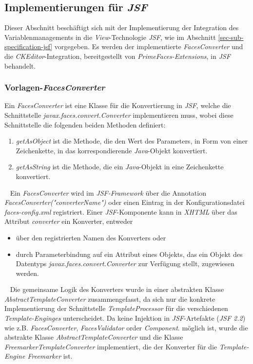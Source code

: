 \subsection{Implementierungen für \emph{JSF}}
\label{sec:sub-impl-integartion-jsf}
Dieser Abschnitt beschäftigt sich mit der Implementierung der Integration des Variablenmanagements in die \emph{View}-Technologie \emph{JSF}, wie im Abschnitt \ref{sec-sub-specification-jsf} vorgegeben. Es werden der implementierte \emph{FacesConverter} und die \emph{CKEditor}-Integration, bereitgestellt von \emph{PrimeFaces-Extensions}, in \emph{JSF} behandelt.

\subsubsection{Vorlagen-\emph{FacesConverter}}
Ein \emph{FacesConverter} ist eine Klasse für die Konvertierung in \emph{JSF}, welche die Schnittstelle \emph{javax.faces.convert.Converter} implementieren muss, wobei diese Schnittstelle die folgenden beiden Methoden definiert:
\begin{enumerate}
	\item\emph{getAsObject} ist die Methode, die den Wert des Parameters, in Form von einer Zeichenkette, in das korrespondierende \emph{Java}-Objekt konvertiert.
	\item\emph{getAsString} ist die Methode, die ein \emph{Java}-Objekt in eine Zeichenkette konvertiert.
\end{enumerate}
\ \newline
Ein \emph{FacesConverter} wird im \emph{JSF-Framework} über die Annotation \emph{FacesConverter("converterName")} oder einen Eintrag in der  Konfigurationsdatei \emph{faces-config.xml} registriert. Einer \emph{JSF}-Komponente kann in \emph{XHTML} über das Attribut \emph{converter} ein Konverter, entweder 
\begin{itemize}
	\item über den registrierten Namen des Konverters oder 
	\item durch Parameterbindung auf ein Attribut eines Objekts, das ein Objekt des Datentyps \emph{javax.faces.convert.Converter} zur Verfügung stellt, zugewiesen werden.
\end{itemize}
\ \newline
Die gemeinsame Logik des Konverters wurde in einer abstrakten Klasse \emph{AbstractTemplateConverter} zusammengefasst, da sich nur die konkrete Implementierung der Schnittstelle \emph{TemplateProcessor} für die verschiedenen \emph{Template-Enginges} unterscheidet. Da keine Injektion in \emph{JSF}-Artefakte (\emph{JSF 2.2}) wie z.B. \emph{FacesConverter}, \emph{FacesValidator} order \emph{Component}. möglich ist, wurde die abstrakte Klasse \emph{AbstractTemplateConverter} und die Klasse \emph{FreemarkerTemplateConverter} implementiert, die der Konverter für die \emph{Template-Engine Freemarker} ist. 

